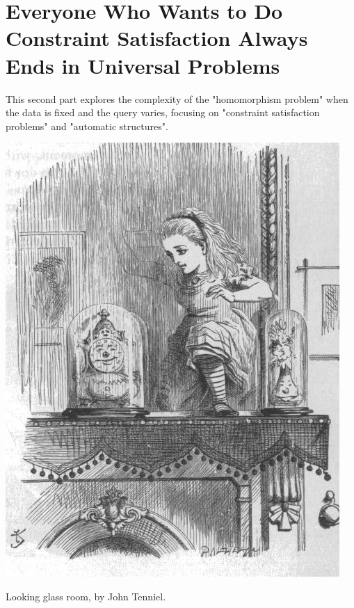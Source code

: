 \section{Everyone Who Wants to Do Constraint Satisfaction Always Ends in Universal Problems}
\label{sec:intro-universal}

This second part explores the complexity of the "homomorphism problem" when the data is fixed and the query varies, focusing on "constraint satisfaction problems" and "automatic structures".

\begin{marginfigure}
	\centering
	\includegraphics[width=\linewidth]{fig/intro/aliceroom2.jpg}
	\caption{Looking glass room, by John Tenniel.}
\end{marginfigure}

